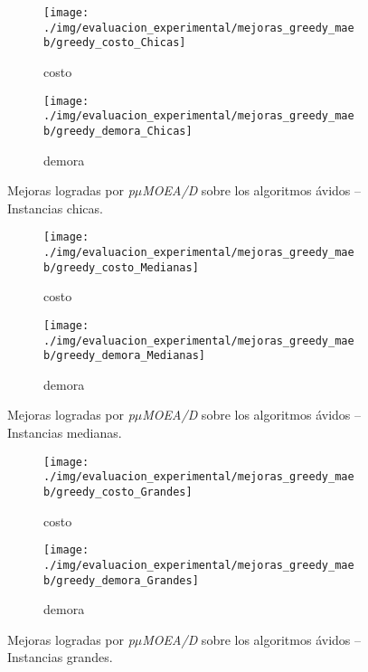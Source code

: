 \begin{figure}[!htpb]
\centering
\begin{subfigure}{.5\textwidth}
  \centering
  \texttt{[image: ./img/evaluacion\_experimental/mejoras\_greedy\_maeb/greedy\_costo\_Chicas]}
  \caption{costo}
  \label{fig:mejoras_greedy_costo_maeb_chicas}
\end{subfigure}%
\begin{subfigure}{.5\textwidth}
  \centering
  \texttt{[image: ./img/evaluacion\_experimental/mejoras\_greedy\_maeb/greedy\_demora\_Chicas]}
  \caption{demora}
  \label{fig:mejoras_greedy_demora_maeb_chicas}
\end{subfigure}
\caption{Mejoras logradas por \textit{p$\mu$MOEA/D} sobre los algoritmos ávidos -- Instancias chicas.}
\label{fig:mejoras_greedy_maeb_chicas}
\end{figure}

\begin{figure}[!htpb]
\centering
\begin{subfigure}{.5\textwidth}
  \centering
  \texttt{[image: ./img/evaluacion\_experimental/mejoras\_greedy\_maeb/greedy\_costo\_Medianas]}
  \caption{costo}
  \label{fig:mejoras_greedy_costo_maeb_medianas}
\end{subfigure}%
\begin{subfigure}{.5\textwidth}
  \centering
  \texttt{[image: ./img/evaluacion\_experimental/mejoras\_greedy\_maeb/greedy\_demora\_Medianas]}
  \caption{demora}
  \label{fig:mejoras_greedy_demora_maeb_medianas}
\end{subfigure}
\caption{Mejoras logradas por \textit{p$\mu$MOEA/D} sobre los algoritmos ávidos -- Instancias medianas.}
\label{fig:mejoras_greedy_maeb_medianas}
\end{figure}


\begin{figure}[!ht]
\centering
\begin{subfigure}{.5\textwidth}
  \centering
  \texttt{[image: ./img/evaluacion\_experimental/mejoras\_greedy\_maeb/greedy\_costo\_Grandes]}
  \caption{costo}
  \label{fig:mejoras_greedy_costo_maeb_grandes}
\end{subfigure}%
\begin{subfigure}{.5\textwidth}
  \centering
  \texttt{[image: ./img/evaluacion\_experimental/mejoras\_greedy\_maeb/greedy\_demora\_Grandes]}
  \caption{demora}
  \label{fig:mejoras_greedy_demora_maeb_grandes}
\end{subfigure}
\caption{Mejoras logradas por \textit{p$\mu$MOEA/D} sobre los algoritmos ávidos -- Instancias grandes.}
\label{fig:mejoras_greedy_maeb_grandes}
\end{figure}


